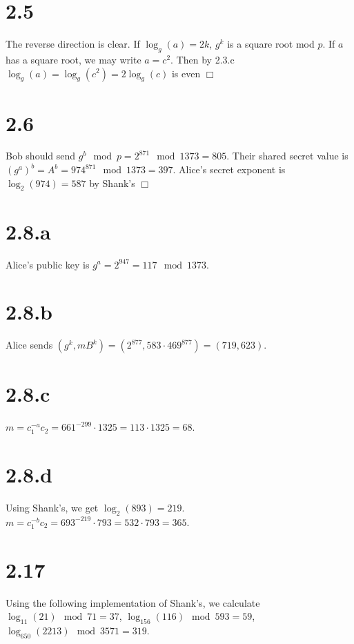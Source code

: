 \documentclass{article}
\begin{document}
\section*{2.5}
The reverse direction is clear. If $\log_g(a) = 2k$, $g^k$ is a square root mod $p$. If $a$ has a square root, we may write $a = c^2$. Then by 2.3.c $\log_g(a) = \log_g(c^2) = 2\log_g(c)$ is even $\Box$

\section*{2.6}
Bob should send $g^b \mod p = 2^{871} \mod 1373 = 805$. Their shared secret value is $(g^a)^b = A^b = 974^{871} \mod 1373 = 397$. Alice's secret exponent is $\log_2(974) = 587$ by Shank's $\Box$

\section*{2.8.a}
Alice's public key is $g^a = 2^{947} = 117 \mod 1373$.
\section*{2.8.b}
Alice sends $(g^k, mB^k) = (2^{877}, 583 \cdot 469^{877}) = (719, 623)$.
\section*{2.8.c}
$m = c_1^{-a}c_2 = 661^{-299} \cdot 1325 = 113 \cdot 1325 = 68$.
\section*{2.8.d}
Using Shank's, we get $\log_2(893) = 219$. $m = c_1^{-b}c_2 = 693^{-219} \cdot 793 = 532 \cdot 793 = 365$.

\section*{2.17}
Using the following implementation of Shank's, we calculate $\log_{11}(21) \mod 71 = 37$, $\log_{156}(116) \mod 593 = 59$, $\log_{650}(2213) \mod 3571 = 319$.

\end{document}
